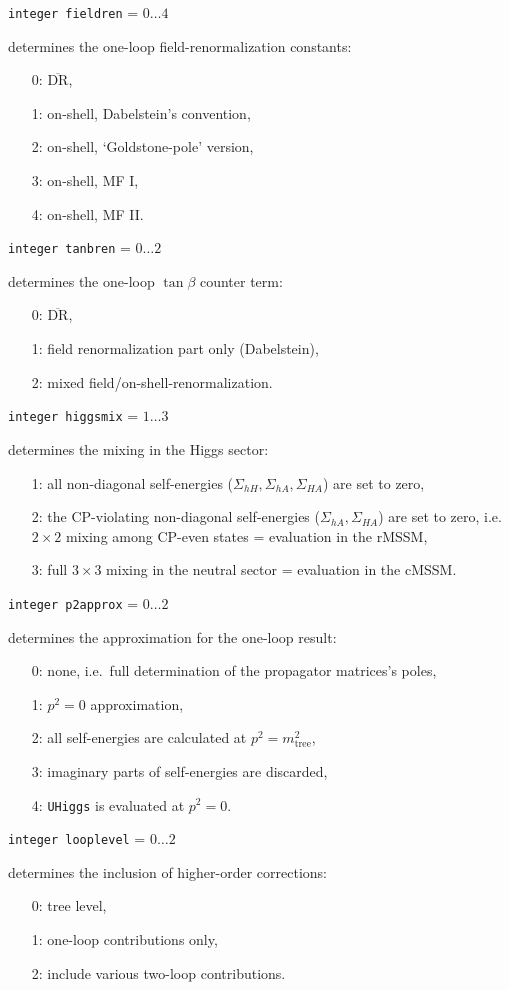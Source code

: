 \documentclass[12pt,a4paper]{report}
\newcommand{\overbar}[1]{\ensuremath{\overline{\mathrm{#1}}}}
\newcommand{\CODE}[1]{\texttt{#1}}
\newcommand{\FLAGOUT}[3]{%
  \item[\fbox{\scriptsize\textsc{out}}]
  \CODE{#1} = $#2\dots#3$ \par}
\newcommand\ie{i.e.\ }
\begin{document}
\FLAGOUT{integer fieldren}{0}{4}
determines the one-loop field-renormalization constants:
\begin{itemize}
\item[0:] \overbar{DR},
\item[1:] on-shell, Dabelstein's convention,
\item[2:] on-shell, `Goldstone-pole' version,
\item[3:] on-shell, MF I,
\item[4:] on-shell, MF II.
\end{itemize}

\FLAGOUT{integer tanbren}{0}{2}
determines the one-loop $\tan\beta$ counter term:
\begin{itemize}
\item[0:] \overbar{DR},
\item[1:] field renormalization part only (Dabelstein),
\item[2:] mixed field/on-shell-renormalization.
\end{itemize}

\FLAGOUT{integer higgsmix}{1}{3}
determines the mixing in the Higgs sector:
\begin{itemize}
\item[1:] all non-diagonal self-energies ($\Sigma_{hH}, \Sigma_{hA}, 
          \Sigma_{HA}$) are set to zero,
\item[2:] the CP-violating non-diagonal self-energies ($\Sigma_{hA}, 
          \Sigma_{HA}$) are set to zero, \ie $2\times 2$ mixing among 
          CP-even states = evaluation in the rMSSM,
\item[3:] full $3\times 3$ mixing in the neutral sector
          = evaluation in the cMSSM.
\end{itemize}

\FLAGOUT{integer p2approx}{0}{2}
determines the approximation for the one-loop result:
\begin{itemize}
\item[0:] none, \ie full determination of the propagator matrices's
  poles,
\item[1:] $p^2 = 0$ approximation,
\item[2:] all self-energies are calculated at $p^2 = m_{\text{tree}}^2$,
\item[3:] imaginary parts of self-energies are discarded,
\item[4:] \CODE{UHiggs} is evaluated at $p^2 = 0$.
\end{itemize}

\FLAGOUT{integer looplevel}{0}{2}
determines the inclusion of higher-order corrections:
\begin{itemize}
\item[0:] tree level,
\item[1:] one-loop contributions only,
\item[2:] include various two-loop contributions.
\end{itemize}
\end{document}
